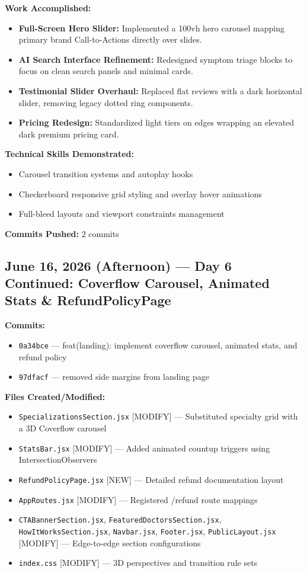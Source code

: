 \documentclass[11pt,a4paper]{article}
\begin{document}
\begin{itemize}
{\textbf{Work Accomplished:}
\begin{itemize}
  \item \textbf{Full-Screen Hero Slider:} Implemented a 100vh hero carousel mapping primary brand Call-to-Actions directly over slides.
  \item \textbf{AI Search Interface Refinement:} Redesigned symptom triage blocks to focus on clean search panels and minimal cards.
  \item \textbf{Testimonial Slider Overhaul:} Replaced flat reviews with a dark horizontal slider, removing legacy dotted ring components.
  \item \textbf{Pricing Redesign:} Standardized light tiers on edges wrapping an elevated dark premium pricing card.
\end{itemize}

\textbf{Technical Skills Demonstrated:}
\begin{itemize}
  \item Carousel transition systems and autoplay hooks
  \item Checkerboard responsive grid styling and overlay hover animations
  \item Full-bleed layouts and viewport constraints management
\end{itemize}

\textbf{Commits Pushed:} 2 commits

\newpage

\subsection{June 16, 2026 (Afternoon) — Day 6 Continued: Coverflow Carousel, Animated Stats \& RefundPolicyPage}

\textbf{Commits:}
\begin{itemize}
  \item \texttt{0a34bce} --- feat(landing): implement coverflow carousel, animated stats, and refund policy
  \item \texttt{97dfacf} --- removed side margins from landing page
\end{itemize}

\textbf{Files Created/Modified:}
\begin{itemize}
  \item \texttt{SpecializationsSection.jsx} [MODIFY] --- Substituted specialty grid with a 3D Coverflow carousel
  \item \texttt{StatsBar.jsx} [MODIFY] --- Added animated countup triggers using IntersectionObservers
  \item \texttt{RefundPolicyPage.jsx} [NEW] --- Detailed refund documentation layout
  \item \texttt{AppRoutes.jsx} [MODIFY] --- Registered /refund route mappings
  \item \texttt{CTABannerSection.jsx}, \texttt{FeaturedDoctorsSection.jsx}, \texttt{HowItWorksSection.jsx}, \texttt{Navbar.jsx}, \texttt{Footer.jsx}, \texttt{PublicLayout.jsx} [MODIFY] --- Edge-to-edge section configurations
  \item \texttt{index.css} [MODIFY] --- 3D perspectives and transition rule sets
\end{itemize}

}
\end{itemize}
\end{document}
